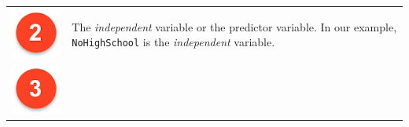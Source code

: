 \documentclass[]{article}
\theoremstyle{definition}
\theoremstyle{definition}
\theoremstyle{definition}
\theoremstyle{remark}
\begin{document}
\begin{longtable}[]{@{}ll@{}}
\begin{minipage}[t]{0.08\columnwidth}
\includegraphics[width=1.00000\textwidth]{./img/circle2.png}\strut
\end{minipage} & \begin{minipage}[t]{0.86\columnwidth}\raggedright\strut
The \emph{independent} variable or the predictor variable. In our
example, \texttt{NoHighSchool} is the \emph{independent} variable.\strut
\end{minipage}\tabularnewline
\begin{minipage}[t]{0.08\columnwidth}\raggedright\strut
\includegraphics[width=1.00000\textwidth]{./img/circle3.png}\strut

\end{minipage}
\end{longtable}
\end{document}
